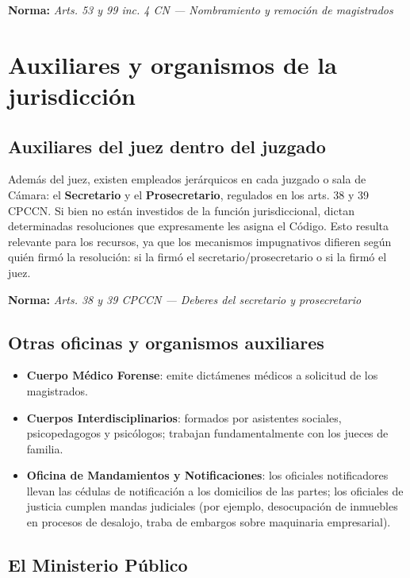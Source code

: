 \documentclass[12pt,oneside]{book}
\newcommand{\norma}[1]{%
\par\noindent\textbf{Norma:} \textit{#1}\par\smallskip
}
\begin{document}
\norma{Arts. 53 y 99 inc. 4 CN --- Nombramiento y remoción de magistrados}

\section{Auxiliares y organismos de la jurisdicción}

\subsection{Auxiliares del juez dentro del juzgado}

Además del juez, existen empleados jerárquicos en cada juzgado o sala de Cámara: el \textbf{Secretario} y el \textbf{Prosecretario}, regulados en los arts. 38 y 39 CPCCN. Si bien no están investidos de la función jurisdiccional, dictan determinadas resoluciones que expresamente les asigna el Código. Esto resulta relevante para los recursos, ya que los mecanismos impugnativos difieren según quién firmó la resolución: si la firmó el secretario/prosecretario o si la firmó el juez.

\norma{Arts. 38 y 39 CPCCN --- Deberes del secretario y prosecretario}

\subsection{Otras oficinas y organismos auxiliares}

\begin{itemize}
    \item \textbf{Cuerpo Médico Forense}: emite dictámenes médicos a solicitud de los magistrados.
    \item \textbf{Cuerpos Interdisciplinarios}: formados por asistentes sociales, psicopedagogos y psicólogos; trabajan fundamentalmente con los jueces de familia.
    \item \textbf{Oficina de Mandamientos y Notificaciones}: los oficiales notificadores llevan las cédulas de notificación a los domicilios de las partes; los oficiales de justicia cumplen mandas judiciales (por ejemplo, desocupación de inmuebles en procesos de desalojo, traba de embargos sobre maquinaria empresarial).
\end{itemize}

\subsection{El Ministerio Público}
\end{document}
